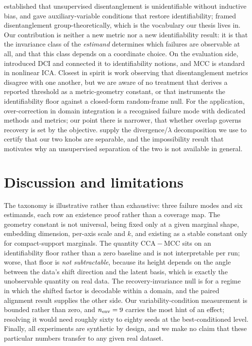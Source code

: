 \documentclass[10pt]{article}
\newcommand{\gap}{\ensuremath{\mathrm{CCA}\!-\!\mathrm{MCC}}}
\begin{document}
\citet{locatello2019challenging} established that unsupervised disentanglement is unidentifiable
without inductive bias, and \citet{khemakhem2020vae} gave auxiliary-variable conditions that restore
identifiability; \citet{higgins2018towards} framed disentanglement group-theoretically, which is the
vocabulary our thesis lives in. Our contribution is neither a new metric nor a new identifiability
result: it is that the invariance class of the \emph{estimand} determines which failures are observable
at all, and that this class depends on a coordinate choice. On the evaluation side,
\citet{eastwood2018framework} introduced DCI and \citet{eastwood2023dcies} connected it to
identifiability notions, and MCC is standard in nonlinear ICA. Closest in spirit is work observing that
disentanglement metrics disagree with one another, but we are aware of no treatment that derives a
reported threshold as a metric-geometry constant, or that instruments the identifiability floor against
a closed-form random-frame null. For the application, over-correction in domain integration is a
recognised failure mode with dedicated methods and metrics; our point there is narrower, that whether
overlap governs recovery is set by the objective. \citet{bendavid2010theory} supply the
divergence/$\lambda$ decomposition we use to certify that our two knobs are separable, and
\citet{bendavid2010impossibility} the impossibility result that motivates why an unsupervised
separation of the two is not available in general.

\section{Discussion and limitations}

The taxonomy is illustrative rather than exhaustive: three failure modes and six estimands, each row an
existence proof rather than a coverage map. The geometry constant is not universal, being fixed only at
a given marginal shape, embedding dimension, per-axis scale and $k$, and existing as a stable constant
only for compact-support marginals. The quantity $\gap$ sits on an identifiability floor rather than a
zero baseline and is not interpretable per run; worse, that floor is \emph{not subtractable}, because
its height depends on the angle between the data's shift direction and the latent basis, which is
exactly the unobservable quantity on real data. The recovery-invariance null is for a regime in which
the shifted factor is decodable within a domain, and the paired alignment result supplies the other
side. Our variability-condition measurement is bounded rather than zero, and $n_{\rm env}=9$ carries
the most hint of an effect; resolving it would need roughly sixty to eighty seeds at the
best-conditioned level. Finally, all experiments are synthetic by design, and we make no claim that
these particular numbers transfer to any given real dataset.
\end{document}
